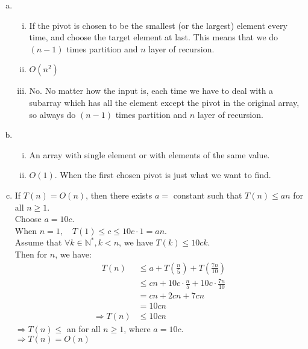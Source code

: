 \documentclass[11pt]{exam}
\begin{document}
\begin{solution}
\begin{enumerate}[(a)]
    \item 
    \begin{enumerate}[i)]
        \item If the pivot is chosen to be the smallest (or the largest) element every time, and choose the target element at last. This means that we do $(n-1)$ times partition and $n$ layer of recursion.
        \item $O(n^2)$
        \item No. No matter how the input is, each time we have to deal with a subarray which has all the element except the pivot in the original array, so always do $(n-1)$ times partition and $n$ layer of recursion.
    \end{enumerate}
    
    \item 
    \begin{enumerate}[i)]
        \item An array with single element or with elements of the same value.
        \item $O(1)$. When the first chosen pivot is just what we want to find.
    \end{enumerate}
    
    \item 
    If $T(n)=O(n)$, then there exists $a=$ constant such that $T(n) \leq an$  for all $n \geqslant 1$. \\
    Choose $a=10c$. \\
    When $n=1, \quad T(1) \leqslant c \leqslant 10 c \cdot 1=a n$. \\
    Assume that $\forall k \in \mathbb{N}^{*}, k<n$, we have $T(k) \leqslant 10 c k$. \\
    Then for $n$, we have:
    \begin{equation*}
        \begin{aligned} 
            \quad T(n) & \leqslant a+T\left(\frac{n}{5}\right)+T\left(\frac{7 n}{10}\right) \\
                       & \leqslant c n+10 c \cdot \frac{n}{5}+10 c \cdot \frac{7 n}{10} \\ 
                       &=c n+2 c n+7 cn \\ 
                       &=10 cn \\ 
                       \Rightarrow T(n) & \leqslant 10 cn
        \end{aligned}
    \end{equation*}
    $\Rightarrow T(n) \leqslant$ an for all $n \geqslant 1$, where $a=10 c$. \\
    $\Rightarrow T(n)=O(n)$
\end{enumerate}
\end{solution}
\end{document}
